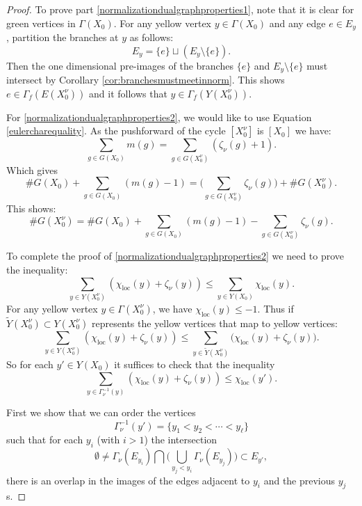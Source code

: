 \documentclass[JEP,XML,SOM,Unicode,NoFloatCountersInSection,published]{cedram}
\theoremstyle{plain}
\theoremstyle{definition}
\newcommand\loc{{\mathrm{loc}}}
\newcommand\Yt{{\widetilde{Y}}}
\begin{document}
\begin{proof}
To prove part \eqref{normalizationdualgraphproperties1}, note that it is clear for green vertices in $\Gamma(X_0)$. For any yellow vertex $y\in \Gamma(X_0)$ and any edge $e\in E_y$, partition the branches at $y$ as follows:\vspace*{-3pt}
\[
E_y = \{e\} \sqcup (E_y\setminus \{e\}).
\]
Then the one dimensional pre-images of the branches $\{e\}$ and $E_y\setminus \{e\}$ must intersect by Corollary \ref{cor:branchesmustmeetinnorm}. This shows $e\in \Gamma_f(E(X^\nu_0))$ and it follows that $y\in \Gamma_f(Y(X^\nu_0))$.

For \eqref{normalizationdualgraphproperties2}, we would like to use Equation \ref{eulercharequality}. As the pushforward of the cycle $[X^\nu_0]$ is $[X_0]$ we have:\vspace*{-3pt}
\[
\sum_{g\in G(X_0)} m(g) = \sum_{g\in G(X_0^\nu)} (\zeta_\nu(g)+1).
\]
Which gives\vspace*{-3pt}
\[
\#G(X_0)+\sum_{g\in G(X_0)} (m(g)-1) = \biggl(\sum_{g\in G(X_0^\nu)} \zeta_\nu(g)\biggr)+\#G(X_0^\nu).
\]
This shows:\vspace*{-3pt}
\[
\#G(X_0^\nu) = \#G(X_0) + \sum_{g\in G(X_0)}(m(g)-1) - \sum_{g\in G(X_0^\nu)} \zeta_\nu(g).
\]

To complete the proof of \eqref{normalizationdualgraphproperties2} we need to prove the inequality:\vspace*{-3pt}
\[
\sum_{y\in Y(X_0^\nu)} \left(\chi_\loc(y) + \zeta_\nu(y)\right)\le \sum_{y\in Y(X_0)} \chi_\loc(y).
\]
For any yellow vertex $y\in \Gamma(X_0^\nu)$, we have $\chi_\loc(y)\le -1$. Thus if $\Yt(X_0^\nu)\subset Y(X_0^\nu)$ represents the yellow vertices that map to yellow vertices:\vspace*{-3pt}
\[
\sum_{y\in Y(X_0^\nu)} \left(\chi_\loc(y) + \zeta_\nu(y)\right)\le\sum_{y\in \Yt(X_0^\nu)} \bigl(\chi_\loc(y) + \zeta_\nu(y)\bigr).
\]
So for each $y'\in Y(X_0)$ it suffices to check that the inequality\vspace*{-3pt}
\[
\sum_{y\in \Gamma_\nu^{-1}(y)} \left(\chi_\loc(y) +\zeta_\nu(y)\right) \le \chi_\loc(y').
\]

First we show that we can order the vertices\vspace*{-3pt}
\[
\Gamma_\nu^{-1}(y')=\{y_1<y_2<\cdots<y_\ell\}
\]
such that for each $y_i$ (with $i>1$) the intersection\vspace*{-3pt}
\[
\emptyset \ne \Gamma_\nu(E_{y_i})\bigcap \biggl(\bigcup_{y_j<y_i} \Gamma_\nu(E_{y_j})\biggr)\subset E_{y'},
\]
\ie there is an overlap in the images of the edges adjacent to $y_i$ and the previous $y_j$s.


\end{proof}
\end{document}
